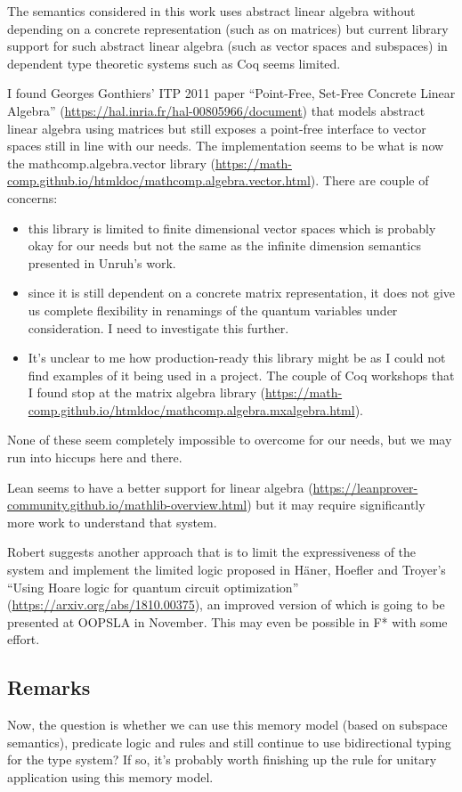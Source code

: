 \documentclass[acmsmall,nonacm,timestamp,review=false,anonymous=false]{acmart}
\begin{document}
The semantics considered in this work uses abstract linear algebra without depending on a concrete representation (such as on matrices) but current library support for such abstract linear algebra (such as vector spaces and subspaces) in dependent type theoretic systems such as Coq seems limited.

I found Georges Gonthiers' ITP 2011 paper ``Point-Free, Set-Free Concrete Linear Algebra'' (\url{https://hal.inria.fr/hal-00805966/document}) that models abstract linear algebra using matrices but still exposes a point-free interface to vector spaces still in line with our needs. The implementation seems to be what is now the mathcomp.algebra.vector library (\url{https://math-comp.github.io/htmldoc/mathcomp.algebra.vector.html}). There are couple of concerns:

\begin{itemize}
	\item this library is limited to finite dimensional vector spaces which is probably okay for our needs but not the same as the infinite dimension semantics presented in Unruh's work.
	\item since it is still dependent on a concrete matrix representation, it does not give us complete flexibility in renamings of the quantum variables under consideration. I need to investigate this further.
	\item It's unclear to me how production-ready this library might be as I could not find examples of it being used in a project. The couple of Coq workshops that I found stop at the matrix algebra library (\url{https://math-comp.github.io/htmldoc/mathcomp.algebra.mxalgebra.html}).
\end{itemize}

None of these seem completely impossible to overcome for our needs, but we may run into hiccups here and there.

Lean seems to have a better support for linear algebra (\url{https://leanprover-community.github.io/mathlib-overview.html}) but it may require significantly more work to understand that system.

Robert suggests another approach that is to limit the expressiveness of the system and implement the limited logic proposed in Häner, Hoefler and Troyer's ``Using Hoare logic for quantum circuit optimization'' (\url{https://arxiv.org/abs/1810.00375}), an improved version of which is going to be presented at OOPSLA in November. This may even be possible in F* with some effort.

\subsection{Remarks}
Now, the question is whether we can use this memory model (based on subspace semantics), predicate logic and rules and still continue to use bidirectional typing for the type system? If so, it's probably worth finishing up the rule for unitary application using this memory model.
\end{document}
